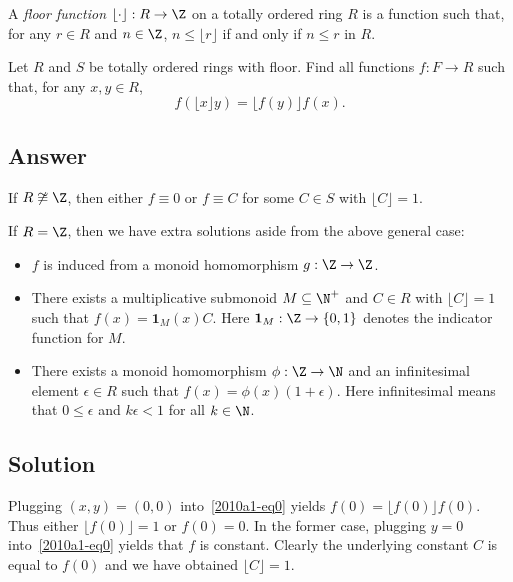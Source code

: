 A \emph{floor function} $\lfloor \cdot \rfloor : R \to \Z$ on a totally ordered ring $R$ is a function such that, for any $r \in R$ and $n \in \Z$, $n \leq \lfloor r \rfloor$ if and only if $n \leq r$ in $R$.

Let $R$ and $S$ be totally ordered rings with floor.
Find all functions $f : F \to R$ such that, for any $x, y \in R$,
\[ f(\lfloor x \rfloor y) = \lfloor f(y) \rfloor f(x). \tag{*}\label{2010a1-eq0} \]



\subsection*{Answer}

If $R \not\cong \Z$, then either $f \equiv 0$ or $f \equiv C$ for some $C \in S$ with $\lfloor C \rfloor = 1$.

If $R = \Z$, then we have extra solutions aside from the above general case:
\begin{itemize}
    
    \item
    $f$ is induced from a monoid homomorphism $g : \Z \to \Z$.

    \item
    There exists a multiplicative submonoid $M \subseteq \N^+$ and $C \in R$ with $\lfloor C \rfloor = 1$ such that $f(x) = \mathbf{1}_M(x) C$.
    Here $\mathbf{1}_M : \Z \to \{0, 1\}$ denotes the indicator function for $M$.
    
    \item
    There exists a monoid homomorphism $\phi : \Z \to \N$ and an infinitesimal element $\epsilon \in R$ such that $f(x) = \phi(x)(1 + \epsilon)$.
    Here infinitesimal means that $0 \leq \epsilon$ and $k \epsilon < 1$ for all $k \in \N$.

\end{itemize}



\subsection*{Solution}

Plugging $(x, y) = (0, 0)$ into~\eqref{2010a1-eq0} yields $f(0) = \lfloor f(0) \rfloor f(0)$.
Thus either $\lfloor f(0) \rfloor = 1$ or $f(0) = 0$.
In the former case, plugging $y = 0$ into~\eqref{2010a1-eq0} yields that $f$ is constant.
Clearly the underlying constant $C$ is equal to $f(0)$ and we have obtained $\lfloor C \rfloor = 1$.

